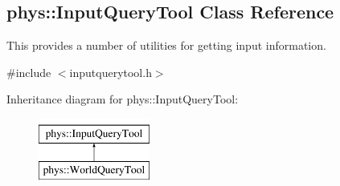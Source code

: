 \hypertarget{classphys_1_1InputQueryTool}{
\subsection{phys::InputQueryTool Class Reference}
\label{da/d96/classphys_1_1InputQueryTool}
}


This provides a number of utilities for getting input information.  




{\ttfamily \#include $<$inputquerytool.h$>$}

Inheritance diagram for phys::InputQueryTool:\begin{figure}[H]
\begin{center}
\leavevmode
\includegraphics[height=2.000000cm]{da/d96/classphys_1_1InputQueryTool}
\end{center}
\end{figure}
